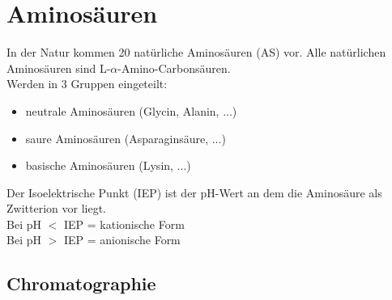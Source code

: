 \section{Aminosäuren}
In der Natur kommen 20 natürliche Aminosäuren (AS) vor.
Alle natürlichen Aminosäuren sind L-$\alpha$-Amino-Carbonsäuren. \\
Werden in 3 Gruppen eingeteilt:
\begin{itemize}
    \item neutrale Aminosäuren (Glycin, Alanin, ...)
    \item saure Aminosäuren (Asparaginsäure, ...)
    \item basische Aminosäuren (Lysin, ...)
\end{itemize}
Der Isoelektrische Punkt (IEP) ist der pH-Wert an dem die Aminosäure als Zwitterion vor liegt. \\
Bei pH $<$ IEP = kationische Form \\
Bei pH $>$ IEP = anionische Form

\subsection{Chromatographie}
